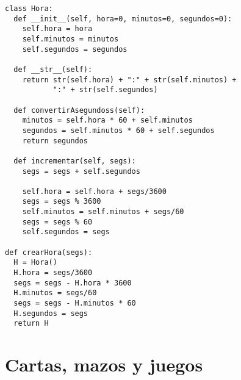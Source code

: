 \beforeverb
\begin{verbatim}
class Hora:
  def __init__(self, hora=0, minutos=0, segundos=0):
    self.hora = hora
    self.minutos = minutos
    self.segundos = segundos

  def __str__(self):
    return str(self.hora) + ":" + str(self.minutos) + 
           ":" + str(self.segundos)

  def convertirAsegundoss(self):
    minutos = self.hora * 60 + self.minutos
    segundos = self.minutos * 60 + self.segundos
    return segundos

  def incrementar(self, segs):
    segs = segs + self.segundos

    self.hora = self.hora + segs/3600
    segs = segs % 3600
    self.minutos = self.minutos + segs/60
    segs = segs % 60
    self.segundos = segs

def crearHora(segs):
  H = Hora()
  H.hora = segs/3600
  segs = segs - H.hora * 3600
  H.minutos = segs/60
  segs = segs - H.minutos * 60
  H.segundos = segs
  return H
\end{verbatim}
\afterverb


\section {Cartas, mazos y juegos}

